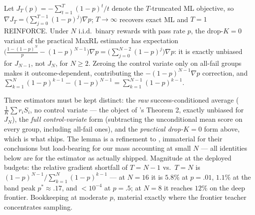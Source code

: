 \begin{lemma}
\label{lem:trunc}
Let $J_T(p) = -\sum_{t=1}^{T}(1-p)^t/t$ denote the $T$-truncated ML
objective, so $\nabla J_T = \big(\sum_{j=0}^{T-1}(1-p)^j\big)\nabla p$;
$T{\to}\infty$ recovers exact ML and $T{=}1$ REINFORCE. Under $N$
i.i.d.\ binary rewards with pass rate $p$, the drop-$K{=}0$ variant of
the practical MaxRL estimator has expectation
$\big(\tfrac{1-(1-p)^N}{p} - (1-p)^{N-1}\big)\nabla p
= \big(\sum_{j=0}^{N-2}(1-p)^j\big)\nabla p$: it is exactly unbiased
for $J_{N-1}$, not $J_N$, for $N \ge 2$. Zeroing the control variate
only on all-fail groups makes it outcome-dependent, contributing the
$-(1-p)^{N-1}\nabla p$ correction, and
$\sum_{k=1}^{N}(1-p)^{k-1} - (1-p)^{N-1} = \sum_{k=1}^{N-1}(1-p)^{k-1}$.
\end{lemma}
\begin{interp}
Three estimators must be kept distinct: the \emph{raw}
success-conditioned average ($\frac{1}{K}\sum r_i S_i$, no control
variate --- the object of \citet{maxrl}'s Theorem 2, exactly unbiased
for $J_N$), the \emph{full control-variate} form (subtracting the
unconditional mean score on every group, including all-fail ones), and
the \emph{practical drop-$K{=}0$} form above, which is what ships.
The lemma is a refinement to \citet{maxrl}, immaterial for their
conclusions but load-bearing for our mass accounting at small $N$ ---
all identities below are for the estimator as actually shipped.
Magnitude at the
deployed budgets: the relative gradient shortfall of $T{=}N{-}1$ vs.\
$T{=}N$ is $(1-p)^{N-1}/\sum_{k=1}^{N}(1-p)^{k-1}$ --- at $N{=}16$ it
is $5.8\%$ at $p{=}.01$, $1.1\%$ at the band peak $p^*{\approx}.17$,
and ${<}10^{-4}$ at $p{=}.5$; at $N{=}8$ it reaches $12\%$ on the deep
frontier. Bookkeeping at moderate $p$, material exactly where the
frontier teacher concentrates sampling.
\end{interp}

